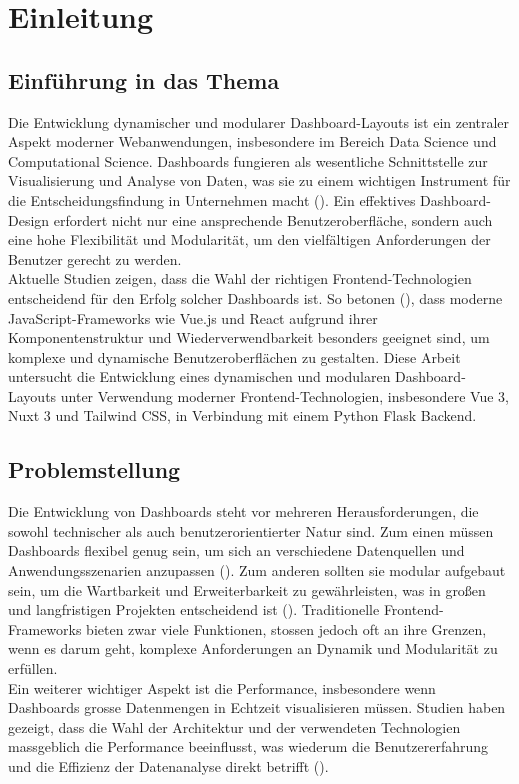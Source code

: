 \documentclass[a4paper, 12pt]{scrartcl}
\begin{document}
		
	\section{Einleitung}
	\label{sec:einleitung}

\subsection{Einführung in das Thema}
Die Entwicklung dynamischer und modularer Dashboard-Layouts ist ein zentraler Aspekt moderner Webanwendungen, insbesondere im Bereich Data Science und Computational Science. Dashboards fungieren als wesentliche Schnittstelle zur Visualisierung und Analyse von Daten, was sie zu einem wichtigen Instrument für die Entscheidungsfindung in Unternehmen macht (\cite[S.119]{Dibia2023}). Ein effektives Dashboard-Design erfordert nicht nur eine ansprechende Benutzeroberfläche, sondern auch eine hohe Flexibilität und Modularität, um den vielfältigen Anforderungen der Benutzer gerecht zu werden.\\[1em] Aktuelle Studien zeigen, dass die Wahl der richtigen Frontend-Technologien entscheidend für den Erfolg solcher Dashboards ist. So betonen (\cite[S.119]{Dibia2023}), dass moderne JavaScript-Frameworks wie Vue.js und React aufgrund ihrer Komponentenstruktur und Wiederverwendbarkeit besonders geeignet sind, um komplexe und dynamische Benutzeroberflächen zu gestalten. Diese Arbeit untersucht die Entwicklung eines dynamischen und modularen Dashboard-Layouts unter Verwendung moderner Frontend-Technologien, insbesondere Vue 3, Nuxt 3 und Tailwind CSS, in Verbindung mit einem Python Flask Backend.

\subsection{Problemstellung}
Die Entwicklung von Dashboards steht vor mehreren Herausforderungen, die sowohl technischer als auch benutzerorientierter Natur sind. Zum einen müssen Dashboards flexibel genug sein, um sich an verschiedene Datenquellen und Anwendungsszenarien anzupassen (\cite[S.119]{Dibia2023}). Zum anderen sollten sie modular aufgebaut sein, um die Wartbarkeit und Erweiterbarkeit zu gewährleisten, was in großen und langfristigen Projekten entscheidend ist (\cite[S.119]{Dibia2023}). Traditionelle Frontend-Frameworks bieten zwar viele Funktionen, stossen jedoch oft an ihre Grenzen, wenn es darum geht, komplexe Anforderungen an Dynamik und Modularität zu erfüllen.\\[1em] Ein weiterer wichtiger Aspekt ist die Performance, insbesondere wenn Dashboards grosse Datenmengen in Echtzeit visualisieren müssen. Studien haben gezeigt, dass die Wahl der Architektur und der verwendeten Technologien massgeblich die Performance beeinflusst, was wiederum die Benutzererfahrung und die Effizienz der Datenanalyse direkt betrifft (\cite[S.119]{Dibia2023}).
\end{document}
